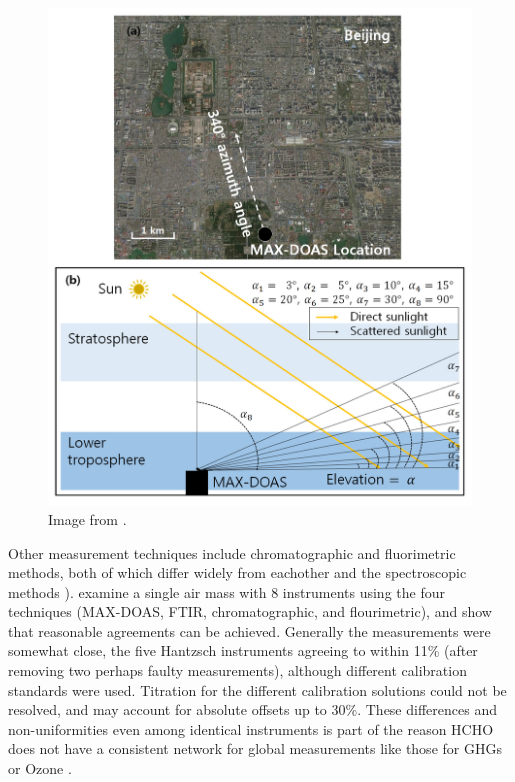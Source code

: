     \begin{figure}
      \includegraphics[width=\textwidth]{Figures/MAXDoasExample.png}
      \caption{ Image from \citet{Lee2015}.}
      \label{ch_LitRev:fig:MAXDOASExample}
    \end{figure}
    
    Other measurement techniques include chromatographic and fluorimetric methods, both of which differ widely from eachother and the spectroscopic methods \citep{Hak2005}).
    \cite{Hak2005} examine a single air mass with 8 instruments using the four techniques (MAX-DOAS, FTIR, chromatographic, and flourimetric), and show that reasonable agreements can be achieved.
    Generally the measurements were somewhat close, the five Hantzsch instruments agreeing to within 11\% (after removing two perhaps faulty measurements), although different calibration standards were used.
    Titration for the different calibration solutions could not be resolved, and may account for absolute offsets up to 30\%.
    These differences and non-uniformities even among identical instruments is part of the reason HCHO does not have a consistent network for global measurements like those for GHGs or Ozone \citep{FortemsCheiney2012}.
    
